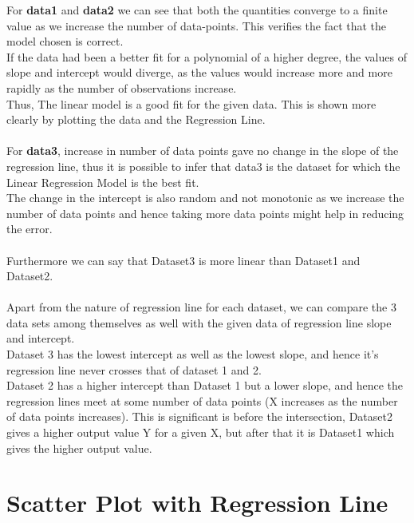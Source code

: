 \documentclass{article}
\begin{document}
For {\bf data1} and {\bf data2} we can see that both the quantities converge to a finite value as we increase the number of data-points. This verifies the fact that the model chosen is correct.\\

If the data had been a better fit for a polynomial of a higher degree, the values of slope and intercept would diverge, as the values would increase more and more rapidly as the number of observations increase.\\

Thus, The linear model is a good fit for the given data. This is shown more clearly by plotting the data and the Regression Line.\\
\\

For {\bf data3}, increase in number of data points gave no change in the slope of the regression line, thus it is possible to infer that data3 is the dataset for which the Linear Regression Model is the best fit.\\

The change in the intercept is also random and not monotonic as we increase the number of data points and hence taking more data points might help in reducing the error.\\
\\

Furthermore we can say that Dataset3 is more linear than Dataset1 and Dataset2.\\
\\

Apart from the nature of regression line for each dataset, we can compare the 3 data sets among themselves as well with the given data of regression line slope and intercept.\\

Dataset 3 has the lowest intercept as well as the lowest slope, and hence it's regression line never crosses that of dataset 1 and 2.\\

Dataset 2 has a higher intercept than Dataset 1 but a lower slope, and hence the regression lines meet at some number of data points (X increases as the number of data points increases). This is significant is before the intersection, Dataset2 gives a higher output value Y for a given X, but after that it is Dataset1 which gives the higher output value.
\pagebreak

\section{Scatter Plot with Regression Line}
\end{document}
